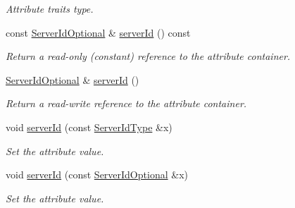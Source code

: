 \begin{DoxyCompactItemize}
\begin{DoxyCompactList}\small\item\em Attribute traits type. \item\end{DoxyCompactList}\item 
const \hyperlink{classopenstack_1_1xml_1_1Image_aa1db490914d5f6ed32aac0485675dead}{ServerIdOptional} \& \hyperlink{classopenstack_1_1xml_1_1Image_ab2936570bde6b5c07ed0c1b47b4a30d9}{serverId} () const 
\begin{DoxyCompactList}\small\item\em Return a read-\/only (constant) reference to the attribute container. \item\end{DoxyCompactList}\item 
\hyperlink{classopenstack_1_1xml_1_1Image_aa1db490914d5f6ed32aac0485675dead}{ServerIdOptional} \& \hyperlink{classopenstack_1_1xml_1_1Image_a82b3c1e6b6ddd37dcd11444ecc646354}{serverId} ()
\begin{DoxyCompactList}\small\item\em Return a read-\/write reference to the attribute container. \item\end{DoxyCompactList}\item 
void \hyperlink{classopenstack_1_1xml_1_1Image_a3297186e9e7c43432ff8dca6505de03a}{serverId} (const \hyperlink{classopenstack_1_1xml_1_1Image_a55fc26e3d730377de0d1e09a64e38a7f}{ServerIdType} \&x)
\begin{DoxyCompactList}\small\item\em Set the attribute value. \item\end{DoxyCompactList}\item 
void \hyperlink{classopenstack_1_1xml_1_1Image_a6085568b6cdb64e54b0677519d1ae466}{serverId} (const \hyperlink{classopenstack_1_1xml_1_1Image_aa1db490914d5f6ed32aac0485675dead}{ServerIdOptional} \&x)
\begin{DoxyCompactList}\small\item\em Set the attribute value. \item\end{DoxyCompactList}\end{DoxyCompactItemize}
